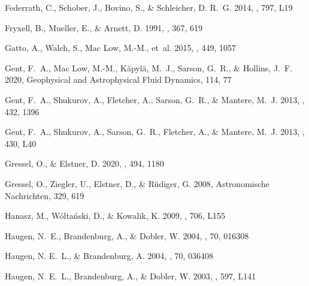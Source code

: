 \documentclass[preprint2]{aastex63}
\begin{document}
\begin{thebibliography}{}
{Federrath}, C., {Schober}, J., {Bovino}, S., \& {Schleicher}, D. R.~G. 2014,
 \apjl, 797, L19

{Fryxell}, B., {Mueller}, E., \& {Arnett}, D. 1991, \apj, 367, 619

{Gatto}, A., {Walch}, S., {Mac Low}, M.-M., {et~al.} 2015, \mnras, 449, 1057

{Gent}, F.~A., {Mac Low}, M.-M., {K{\"a}pyl{\"a}}, M.~J., {Sarson}, G.~R., \&
 {Hollins}, J.~F. 2020, Geophysical and Astrophysical Fluid Dynamics, 114, 77

{Gent}, F.~A., {Shukurov}, A., {Fletcher}, A., {Sarson}, G.~R., \& {Mantere},
 M.~J. 2013{}, \mnras, 432, 1396

{Gent}, F.~A., {Shukurov}, A., {Sarson}, G.~R., {Fletcher}, A., \& {Mantere},
 M.~J. 2013{}, \mnras, 430, L40

{Gressel}, O., \& {Elstner}, D. 2020, \mnras, 494, 1180

{Gressel}, O., {Ziegler}, U., {Elstner}, D., \& {R{\"u}diger}, G. 2008,
 Astronomische Nachrichten, 329, 619

{Hanasz}, M., {W{\'o}lta{\'n}ski}, D., \& {Kowalik}, K. 2009, \apjl, 706, L155

{Haugen}, N.~E., {Brandenburg}, A., \& {Dobler}, W. 2004{}, \pre,
 70, 016308

{Haugen}, N. E.~L., \& {Brandenburg}, A. 2004, \pre, 70, 036408

{Haugen}, N. E.~L., {Brandenburg}, A., \& {Dobler}, W. 2003, \apjl, 597, L141


\end{thebibliography}
\end{document}
